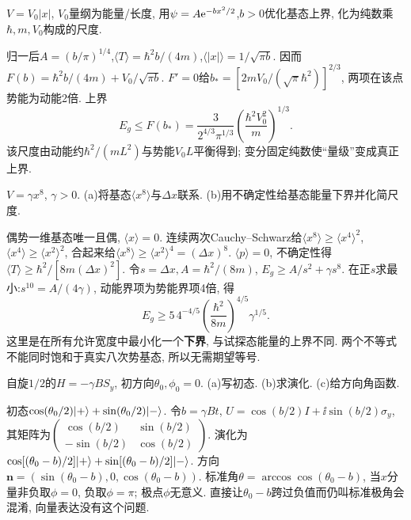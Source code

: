 \begin{exercise}
$V=V_0|x|$, $V_0$量纲为能量/长度, 用$\psi=A\mathrm e^{-bx^2/2}$,$b>0$优化基态上界, 化为纯数乘$\hbar,m,V_0$构成的尺度.
\end{exercise}
\begin{solution}
归一后$A=(b/\pi)^{1/4}$,$\langle T\rangle=\hbar^2b/(4m)$,$\langle|x|\rangle=1/\sqrt{\pi b}$. 因而$F(b)=\hbar^2b/(4m)+V_0/\sqrt{\pi b}$. $F'=0$给$b_*=[2mV_0/(\sqrt\pi\hbar^2)]^{2/3}$, 两项在该点势能为动能2倍. 上界
\[
E_g\leq F(b_*)=\frac3{2^{4/3}\pi^{1/3}}\left(\frac{\hbar^2V_0^2}{m}\right)^{1/3}.
\]
该尺度由动能约$\hbar^2/(mL^2)$与势能$V_0L$平衡得到; 变分固定纯数使“量级”变成真正上界.
\end{solution}
\begin{exercise}
$V=\gamma x^8$, $\gamma>0$. (a)将基态$\langle x^8\rangle$与$\Delta x$联系. (b)用不确定性给基态能量下界并化简尺度.
\end{exercise}
\begin{solution}
偶势一维基态唯一且偶, $\langle x\rangle=0$. 连续两次Cauchy--Schwarz给$\langle x^8\rangle\geq\langle x^4\rangle^2$, $\langle x^4\rangle\geq\langle x^2\rangle^2$, 合起来给$\langle x^8\rangle\geq\langle x^2\rangle^4=(\Delta x)^8$. $\langle p\rangle=0$, 不确定性得$\langle T\rangle\geq\hbar^2/[8m(\Delta x)^2]$. 令$s=\Delta x,A=\hbar^2/(8m)$, $E_g\geq A/s^2+\gamma s^8$. 在正$s$求最小:$s^{10}=A/(4\gamma)$, 动能界项为势能界项4倍, 得
\[
E_g\geq5\,4^{-4/5}\left(\frac{\hbar^2}{8m}\right)^{4/5}\gamma^{1/5}.
\]
这里是在所有允许宽度中最小化一个\textbf{下界}, 与试探态能量的上界不同. 两个不等式不能同时饱和于真实八次势基态, 所以无需期望等号.
\end{solution}
\begin{exercise}
自旋$1/2$的$H=-\gamma BS_y$, 初方向$\theta_0,\phi_0=0$. (a)写初态. (b)求演化. (c)给方向角函数.
\end{exercise}
\begin{solution}
初态$\cos(\theta_0/2)\lvert +\rangle+\sin(\theta_0/2)\lvert -\rangle$. 令$b=\gamma Bt$, $U=\cos(b/2)I+\ii\sin(b/2)\sigma_y$, 其矩阵为$\left(\begin{smallmatrix}\cos(b/2)&\sin(b/2)\\-\sin(b/2)&\cos(b/2)\end{smallmatrix}\right)$. 演化为$\cos[(\theta_0-b)/2]\lvert +\rangle+\sin[(\theta_0-b)/2]\lvert -\rangle$. 方向$\boldsymbol n=(\sin(\theta_0-b),0,\cos(\theta_0-b))$. 标准角$\theta=\arccos\cos(\theta_0-b)$, 当$x$分量非负取$\phi=0$, 负取$\phi=\pi$; 极点$\phi$无意义. 直接让$\theta_0-b$跨过负值而仍叫标准极角会混淆, 向量表达没有这个问题.
\end{solution}
